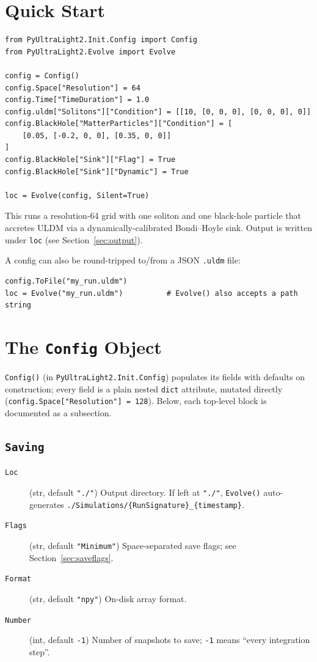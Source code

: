 \documentclass[11pt]{article}
\newcommand{\code}[1]{\texttt{#1}}
\newcommand{\field}[1]{\texttt{#1}}
\begin{document}
\section{Quick Start}

\begin{verbatim}
from PyUltraLight2.Init.Config import Config
from PyUltraLight2.Evolve import Evolve

config = Config()
config.Space["Resolution"] = 64
config.Time["TimeDuration"] = 1.0
config.uldm["Solitons"]["Condition"] = [[10, [0, 0, 0], [0, 0, 0], 0]]
config.BlackHole["MatterParticles"]["Condition"] = [
    [0.05, [-0.2, 0, 0], [0.35, 0, 0]]
]
config.BlackHole["Sink"]["Flag"] = True
config.BlackHole["Sink"]["Dynamic"] = True

loc = Evolve(config, Silent=True)
\end{verbatim}
This runs a resolution-64 grid with one soliton and one black-hole particle
that accretes ULDM via a dynamically-calibrated Bondi--Hoyle sink. Output is
written under \code{loc} (see Section~\ref{sec:output}).

A config can also be round-tripped to/from a JSON \code{.uldm} file:
\begin{verbatim}
config.ToFile("my_run.uldm")
loc = Evolve("my_run.uldm")          # Evolve() also accepts a path string
\end{verbatim}

\section{The \code{Config} Object}
\label{sec:config}

\code{Config()} (in \code{PyUltraLight2.Init.Config}) populates its fields with
defaults on construction; every field is a plain nested \code{dict} attribute,
mutated directly (\code{config.Space["Resolution"] = 128}). Below, each
top-level block is documented as a subsection.

\subsection{\field{Saving}}
\begin{description}
  \item[\field{Loc}] (str, default \code{"./"}) Output directory. If left at
    \code{"./"}, \code{Evolve()} auto-generates
    \code{./Simulations/\{RunSignature\}\_\{timestamp\}}.
  \item[\field{Flags}] (str, default \code{"Minimum"}) Space-separated save
    flags; see Section~\ref{sec:saveflags}.
  \item[\field{Format}] (str, default \code{"npy"}) On-disk array format.
  \item[\field{Number}] (int, default \code{-1}) Number of snapshots to save;
    \code{-1} means ``every integration step''.
\end{description}
\end{document}
